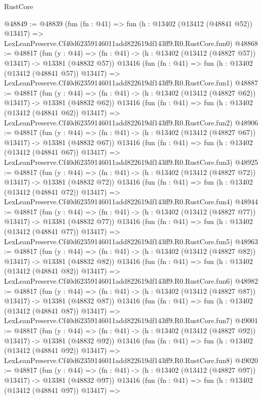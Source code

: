 \begin{lexlean}{RustCore}
\begin{coremodule}
@48849 := @48839
    (fun (fn : @41) =>
    fun (h : @13402 (@13412 (@48841 @52)) @13417) =>
    LexLeanPreserve.Cf40d62359146011add822619df143ff9.R0.RustCore.fun0)
@48868 := @48817
    (fun (y : @44) =>
    (fn : @41) -> (h : @13402 (@13412 (@48827 @57)) @13417) -> @13381 (@48832 @57))
    @13416
    (fun (fn : @41) =>
    fun (h : @13402 (@13412 (@48841 @57)) @13417) =>
    LexLeanPreserve.Cf40d62359146011add822619df143ff9.R0.RustCore.fun1)
@48887 := @48817
    (fun (y : @44) =>
    (fn : @41) -> (h : @13402 (@13412 (@48827 @62)) @13417) -> @13381 (@48832 @62))
    @13416
    (fun (fn : @41) =>
    fun (h : @13402 (@13412 (@48841 @62)) @13417) =>
    LexLeanPreserve.Cf40d62359146011add822619df143ff9.R0.RustCore.fun2)
@48906 := @48817
    (fun (y : @44) =>
    (fn : @41) -> (h : @13402 (@13412 (@48827 @67)) @13417) -> @13381 (@48832 @67))
    @13416
    (fun (fn : @41) =>
    fun (h : @13402 (@13412 (@48841 @67)) @13417) =>
    LexLeanPreserve.Cf40d62359146011add822619df143ff9.R0.RustCore.fun3)
@48925 := @48817
    (fun (y : @44) =>
    (fn : @41) -> (h : @13402 (@13412 (@48827 @72)) @13417) -> @13381 (@48832 @72))
    @13416
    (fun (fn : @41) =>
    fun (h : @13402 (@13412 (@48841 @72)) @13417) =>
    LexLeanPreserve.Cf40d62359146011add822619df143ff9.R0.RustCore.fun4)
@48944 := @48817
    (fun (y : @44) =>
    (fn : @41) -> (h : @13402 (@13412 (@48827 @77)) @13417) -> @13381 (@48832 @77))
    @13416
    (fun (fn : @41) =>
    fun (h : @13402 (@13412 (@48841 @77)) @13417) =>
    LexLeanPreserve.Cf40d62359146011add822619df143ff9.R0.RustCore.fun5)
@48963 := @48817
    (fun (y : @44) =>
    (fn : @41) -> (h : @13402 (@13412 (@48827 @82)) @13417) -> @13381 (@48832 @82))
    @13416
    (fun (fn : @41) =>
    fun (h : @13402 (@13412 (@48841 @82)) @13417) =>
    LexLeanPreserve.Cf40d62359146011add822619df143ff9.R0.RustCore.fun6)
@48982 := @48817
    (fun (y : @44) =>
    (fn : @41) -> (h : @13402 (@13412 (@48827 @87)) @13417) -> @13381 (@48832 @87))
    @13416
    (fun (fn : @41) =>
    fun (h : @13402 (@13412 (@48841 @87)) @13417) =>
    LexLeanPreserve.Cf40d62359146011add822619df143ff9.R0.RustCore.fun7)
@49001 := @48817
    (fun (y : @44) =>
    (fn : @41) -> (h : @13402 (@13412 (@48827 @92)) @13417) -> @13381 (@48832 @92))
    @13416
    (fun (fn : @41) =>
    fun (h : @13402 (@13412 (@48841 @92)) @13417) =>
    LexLeanPreserve.Cf40d62359146011add822619df143ff9.R0.RustCore.fun8)
@49020 := @48817
    (fun (y : @44) =>
    (fn : @41) -> (h : @13402 (@13412 (@48827 @97)) @13417) -> @13381 (@48832 @97))
    @13416
    (fun (fn : @41) =>
    fun (h : @13402 (@13412 (@48841 @97)) @13417) =>

\end{coremodule}
\end{lexlean}

